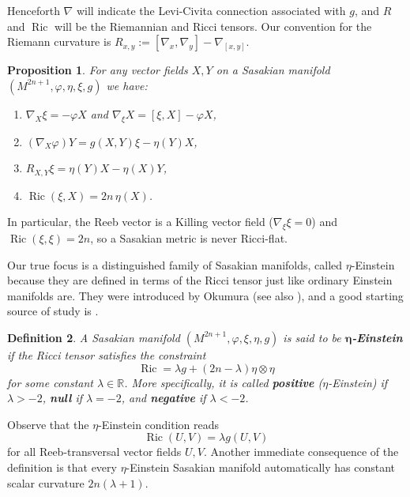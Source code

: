 \documentclass[12pt, twoside]{amsart}
\def\R{\mathbb{R}}
\def\ric{\operatorname{Ric}}
\newtheorem{definition}{\bf Definition}[section]
\newtheorem{prop}[definition]{Proposition}
\theoremstyle{definition}
\begin{document}
Henceforth $\nabla$ will indicate the Levi-Civita connection associated with $g$, and $R$ and $\ric$ will be the Riemannian and Ricci tensors. Our convention for the Riemann curvature is $R_{x,y}:=[\nabla_{x},\nabla_{y}] - \nabla_{[x,y]}$. 


\begin{prop}\label{nabla xi}
For any vector fields $X,Y$ on a Sasakian manifold  $(M^{2n+1},\varphi,\eta,\xi, g)$ we have:
    \begin{enumerate}
        \item $\nabla_{X}\xi= - \varphi X$\; and\; $\nabla_{\xi}X=[\xi,X]-\varphi X$,\smallskip
        \item $(\nabla_{X}\varphi)Y=g(X,Y) \xi-\eta(Y)X$,\smallskip
        \item $R_{X,Y}\xi=\eta(Y)X-\eta(X)Y$, \smallskip
        \item $\ric(\xi,X)=2n\,\eta(X)$.
    \end{enumerate}
\end{prop}

In particular, the Reeb vector is a Killing vector field ($\nabla_\xi \xi=0$) 
and $\ric(\xi,\xi)=2n$, so a Sasakian metric is never Ricci-flat.

\medskip

Our true focus is a distinguished family of Sasakian manifolds, called  $\eta$-Einstein because they are defined in terms of the Ricci tensor just like ordinary Einstein manifolds are. They were introduced by Okumura \cite{Oku} (see also \cite{sas}), and a good starting source of study is \cite{BGM}.

\begin{definition}\label{def:eta-ES} 
A Sasakian manifold $(M^{2n+1},\varphi,\xi,\eta, g)$ is said to be {\bf $\boldsymbol \eta$-Einstein} if the Ricci tensor satisfies the constraint 
$$
\ric = \lambda g + (2n-\lambda) \eta \otimes \eta
$$
for some constant $\lambda\in \R$. 
More specifically, it is called {\bf positive} ($\eta$-Einstein) if $\lambda >-2$, {\bf null} if $\lambda=-2$, and {\bf negative} if $\lambda < -2$.\par
\end{definition}

Observe that the $\eta$-Einstein condition reads 
$$
    \ric(U,V)=\lambda g(U,V)
$$
for all Reeb-transversal vector fields $U,V$. 
Another immediate consequence of the definition is that every $\eta$-Einstein  Sasakian manifold automatically has constant scalar curvature $2n(\lambda+1)$.
\end{document}
